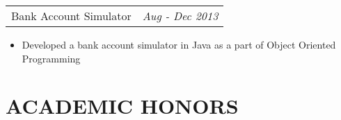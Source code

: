 \documentclass[margin]{res}
\begin{document}
\begin{resume}
                   
                  
                 \begin{tabular}{p{4.2in} r} %
                  Bank Account Simulator &  \textit{Aug - Dec 2013}
                 \end{tabular}
                  \begin{itemize}					        
                   \item[] Developed a bank account simulator in Java as a part of Object Oriented \\Programming 
                  \end{itemize}
                  
 

                  

\section{ACADEMIC HONORS} 
			\begin{itemize}
			

\end{itemize}
\end{resume}
\end{document}
